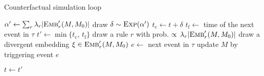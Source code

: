 \begin{algorithm}
\caption{Counterfactual simulation loop}\label{alg:cosimulation}
\begin{spacing}{1.2}
\begin{algorithmic}
  \STATE 
  \STATE \COMMENT { $t$ is the current time, $M$ the current state mixture and
    $M_0$ the intermediate state of $\tau$ at time $t$ }
  \STATE
  \STATE $\alpha' \gets \sum_r {\lambda_r |{\textsc{Emb}}'_{r}(M, M_0)|}$
  \STATE draw $\delta \sim \textsc{Exp}(\alpha') $
  \STATE $t_{\text{c}} \gets t + \delta$
  \STATE $t_{\text{f}} \gets $ time of the next event in $\tau$
  \STATE $t' \gets \min \{ t_{\text{c}}, \, t_{\text{f}} \}$
      \STATE draw a rule $r$ with prob.
      $\propto \, \lambda_r |{\textsc{Emb}}'_{r}(M, M_0)|$
      \STATE  draw a divergent embedding $\xi \in {\textsc{Emb}}'_{r}(M, M_0)$
  \ELSE
      \STATE $e \gets $ next event in $\tau$
  \ENDIF
      \STATE update $M$ by triggering event $e$
  \ENDIF

  \STATE $t \gets t'$
  \STATE
\end{algorithmic}
\end{spacing}
\end{algorithm}